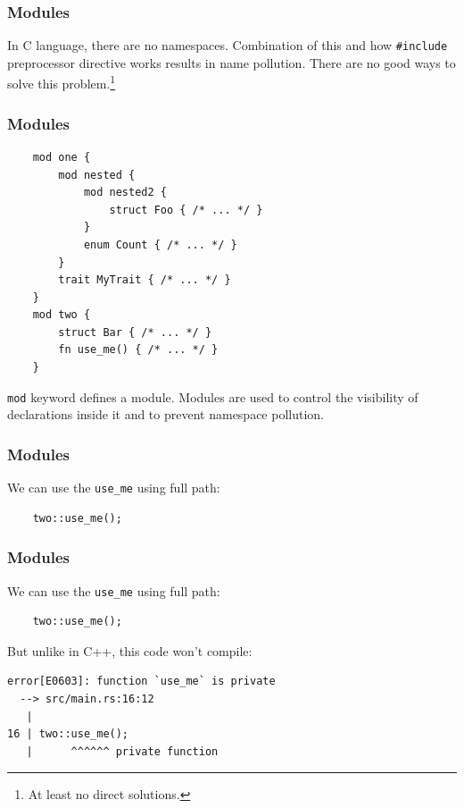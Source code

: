 \documentclass[aspectratio=1610,t]{beamer}
\begin{document}

\begin{frame}[fragile]
\frametitle{Modules}
In C language, there are no namespaces. Combination of this and how \texttt{\#include} preprocessor directive works results in name pollution. There are no good ways to solve this problem.\footnote{At least no direct solutions.}


\end{frame}


\begin{frame}[fragile]
\frametitle{Modules}
\begin{verbatim}
    mod one {
        mod nested {
            mod nested2 {
                struct Foo { /* ... */ }
            }
            enum Count { /* ... */ }
        }
        trait MyTrait { /* ... */ }
    }
    mod two {
        struct Bar { /* ... */ }
        fn use_me() { /* ... */ }
    }
\end{verbatim}

\texttt{mod} keyword defines a module. Modules are used to control the visibility of declarations inside it and to prevent namespace pollution.
\end{frame}


\begin{frame}[fragile]
\frametitle{Modules}
We can use the \texttt{use\_me} using full path:

\begin{verbatim}
    two::use_me();
\end{verbatim}
\end{frame}


\begin{frame}[fragile]
\frametitle{Modules}
We can use the \texttt{use\_me} using full path:

\begin{verbatim}
    two::use_me();
\end{verbatim}

But unlike in C++, this code won't compile:

\begin{verbatim}
error[E0603]: function `use_me` is private
  --> src/main.rs:16:12
   |
16 | two::use_me();
   |      ^^^^^^ private function
\end{verbatim}
\end{frame}
\end{document}
